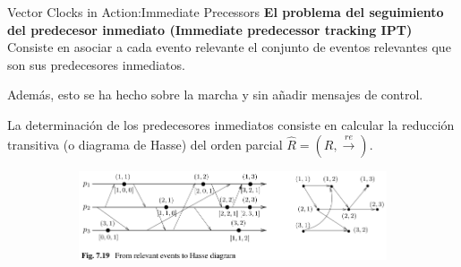 \begin{frame}[fragile]{Vector Clocks in Action:}{Immediate Precessors}
    \justifying
    \textbf{El problema del seguimiento del predecesor inmediato (Immediate predecessor tracking IPT)} 
    Consiste en asociar a cada evento relevante el conjunto de eventos relevantes que son sus predecesores inmediatos.

    Además, esto se ha hecho sobre la marcha y sin añadir mensajes de control.
    
    La determinación de los predecesores inmediatos consiste en calcular la reducción transitiva (o diagrama de Hasse) del orden parcial $\widehat{R}=(R,\xrightarrow[]{re})$. 

    \justifying
    \begin{figure}
        \begin{subfigure}[b]{\textwidth}
            \includegraphics[scale=0.7]{Imagenes/eventosRelevantes03.png}
            \label{fig:ejemplo2}
        \end{subfigure}
    \end{figure}

\end{frame}